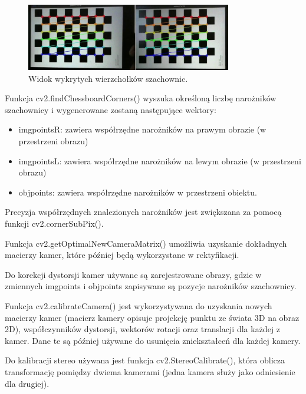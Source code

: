 \documentclass[magisterska]{pracadypl}
\begin{document}
\begin{figure}[H]  %
    \centering  %
    \includegraphics[width=0.8\textwidth]{images/calib.png}  %
    \captionsetup{font=footnotesize}
    \caption[Widok wykrytych wierzchołków szachownic. https://learnopencv.com/making-a-low-cost-stereo-camera-using-opencv/.]{Widok wykrytych wierzchołków szachownic.}
\end{figure}

Funkcja cv2.findChessboardCorners() wyszuka określoną liczbę narożników szachownicy
i wygenerowane zostaną następujące wektory:

\begin{itemize}
  \item imgpointsR: zawiera współrzędne narożników na prawym obrazie (w przestrzeni obrazu)
  \item imgpointsL: zawiera współrzędne narożników na lewym obrazie (w przestrzeni obrazu)
  \item objpoints: zawiera współrzędne narożników w przestrzeni obiektu.
\end{itemize}

Precyzja współrzędnych znalezionych narożników jest zwiększana za pomocą funkcji cv2.cornerSubPix().

Funkcja cv2.getOptimalNewCameraMatrix() umożliwia uzyskanie dokładnych macierzy kamer, które później będą wykorzystane w rektyfikacji.

Do korekcji dystorsji kamer używane są zarejestrowane obrazy, gdzie w zmiennych imgpoints i objpoints zapisywane są pozycje narożników szachownicy.

Funkcja cv2.calibrateCamera() jest wykorzystywana do uzyskania nowych macierzy kamer (macierz kamery opisuje projekcję punktu ze świata 3D na obraz 2D), współczynników dystorsji, wektorów rotacji oraz translacji dla każdej z kamer. Dane te są później używane do usunięcia zniekształceń dla każdej kamery.

Do kalibracji stereo używana jest funkcja cv2.StereoCalibrate(), która oblicza transformację pomiędzy dwiema kamerami (jedna kamera służy jako odniesienie dla drugiej).
\end{document}
